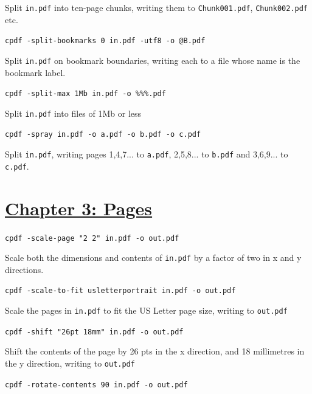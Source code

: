 \documentclass{book}
\begin{document}
\noindent Split \texttt{in.pdf} into ten-page chunks, writing them to \texttt{Chunk001.pdf}, \texttt{Chunk002.pdf} etc.

\begin{framed}\noindent\texttt{cpdf -split-bookmarks 0 in.pdf -utf8 -o @B.pdf}\end{framed}

\noindent Split \texttt{in.pdf} on bookmark boundaries, writing each to a file whose name is the bookmark label.

\begin{framed}\noindent\texttt{cpdf -split-max 1Mb in.pdf -o \%\%\%.pdf}\end{framed}

\noindent Split \texttt{in.pdf} into files of 1Mb or less

\begin{framed}\noindent\texttt{cpdf -spray in.pdf -o a.pdf -o b.pdf -o c.pdf}\end{framed}

\noindent Split \texttt{in.pdf}, writing pages 1,4,7... to \texttt{a.pdf}, 2,5,8... to \texttt{b.pdf} and 3,6,9... to \texttt{c.pdf}.

\section*{\hyperref[chap:3]{Chapter 3: Pages}}

\begin{framed}\noindent\texttt{cpdf -scale-page "2 2" in.pdf -o out.pdf}\end{framed}

\noindent Scale both the dimensions and contents of \texttt{in.pdf} by a factor of two in x and y directions.

\begin{framed}\noindent\texttt{cpdf -scale-to-fit usletterportrait in.pdf -o out.pdf}\end{framed}

\noindent Scale the pages in \texttt{in.pdf} to fit the US Letter page size, writing to \texttt{out.pdf}

\begin{framed}\noindent\texttt{cpdf -shift "26pt 18mm" in.pdf -o out.pdf}\end{framed}

\noindent Shift the contents of the page by 26 pts in the x direction, and 18 millimetres in the y direction, writing to \texttt{out.pdf}

\begin{framed}\noindent\texttt{cpdf -rotate-contents 90 in.pdf -o out.pdf}\end{framed}
\end{document}
